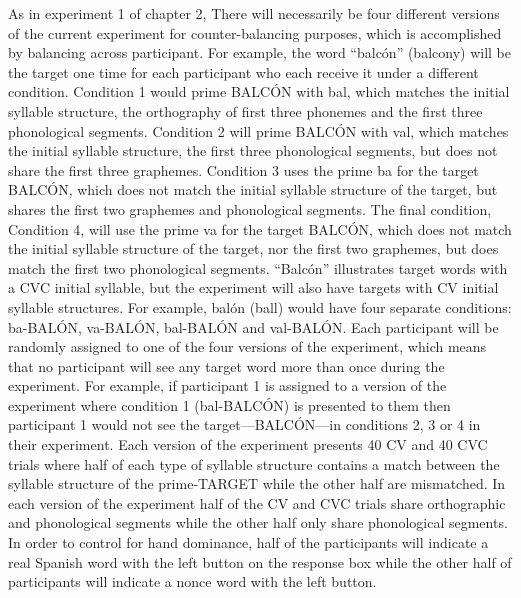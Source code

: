 As in experiment 1 of chapter 2, There will necessarily be four different versions of the current experiment for counter-balancing purposes, which is accomplished by balancing across participant. For example, the word “balcón” (balcony) will be the target one time for each participant who each receive it under a different condition. Condition 1 would prime BALCÓN with bal, which matches the initial syllable structure, the orthography of first three phonemes and the first three phonological segments. Condition 2 will prime BALCÓN with val, which matches the initial syllable structure, the first three phonological segments, but does not share the first three graphemes. Condition 3 uses the prime ba for the target BALCÓN, which does not match the initial syllable structure of the target, but shares the first two graphemes and phonological segments. The final condition, Condition 4, will use the prime va for the target BALCÓN, which does not match the initial syllable structure of the target, nor the first two graphemes, but does match the first two phonological segments. “Balcón” illustrates target words with a CVC initial syllable, but the experiment will also have targets with CV initial syllable structures. For example, balón (ball) would have four separate conditions: ba-BALÓN, va-BALÓN, bal-BALÓN and val-BALÓN.
Each participant will be randomly assigned to one of the four versions of the experiment, which means that no participant will see any target word more than once during the experiment. For example, if participant 1 is assigned to a version of the experiment where condition 1 (bal-BALCÓN) is presented to them then participant 1 would not see the target—BALCÓN—in conditions 2, 3 or 4 in their experiment. Each version of the experiment presents 40 CV and 40 CVC trials where half of each type of syllable structure contains a match between the syllable structure of the prime-TARGET while the other half are mismatched. In each version of the experiment half of the CV and CVC trials share orthographic and phonological segments while the other half only share phonological segments. In order to control for hand dominance, half of the participants will indicate a real Spanish word with the left button on the response box while the other half of participants will indicate a nonce word with the left button.


